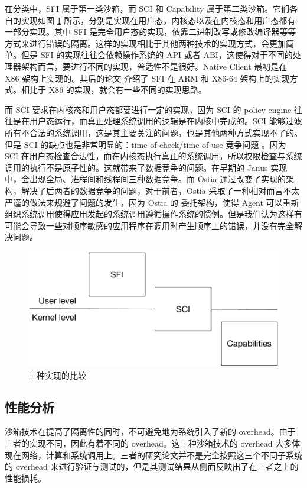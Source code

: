 \documentclass[final,12pt]{elsarticle}
\begin{document}
在分类中，SFI 属于第一类沙箱，而 SCI 和 Capability 属于第二类沙箱。它们各自的实现如图 \ref{fig:difference} 所示，分别是实现在用户态，内核态以及在内核态和用户态都有一部分实现。其中 SFI 是完全用户态的实现，依靠二进制改写或修改编译器等等方式来进行错误的隔离。这样的实现相比于其他两种技术的实现方式，会更加简单。但是 SFI 的实现往往会依赖操作系统的 API 或者 ABI，这使得对于不同的处理器架构而言，要进行不同的实现，普适性不是很好。Native Client 最初是在 X86 架构上实现的。其后的论文 \cite{sehr2010adapting} 介绍了 SFI 在 ARM 和 X86-64 架构上的实现方式。相比于 X86 的实现，就会有一些不同的实现思路。

而 SCI 要求在内核态和用户态都要进行一定的实现，因为 SCI 的 policy engine 往往是在用户态运行，而真正处理系统调用的逻辑是在内核中完成的。SCI 能够过滤所有不合法的系统调用，这是其主要关注的问题，也是其他两种方式实现不了的。但是 SCI 的缺点也是非常明显的：time-of-check/time-of-use 竞争问题 \cite{bishop1996checking}。因为 SCI 在用户态检查合法性，而在内核态执行真正的系统调用，所以权限检查与系统调用的执行不是原子性的。这就带来了数据竞争的问题。在早期的 Janus 实现中，会出现全局、进程间和线程间三种数据竞争。而 Ostia 通过改变了实现的架构，解决了后两者的数据竞争的问题，对于前者，Ostia 采取了一种相对而言不太严谨的做法来规避了问题的发生，因为 Ostia 的 委托架构，使得 Agent 可以重新组织系统调用使得应用发起的系统调用遵循操作系统的惯例。但是我们认为这样有可能会导致一些对顺序敏感的应用程序在调用时产生顺序上的错误，并没有完全解决问题。


\begin{figure}
\centering
\includegraphics[width=0.7\linewidth]{imgs/difference}
\caption{三种实现的比较}
\label{fig:difference}
\end{figure}

\subsection{性能分析}
\label{ss: analysis}

沙箱技术在提高了隔离性的同时，不可避免地为系统引入了新的 overhead。由于三者的实现不同，因此有着不同的 overhead。这三种沙箱技术的 overhead 大多体现在网络，计算和系统调用上。三者的研究论文并不是完全按照这三个不同子系统的 overhead 来进行验证与测试的，但是其测试结果从侧面反映出了在三者之上的性能损耗。
\end{document}

